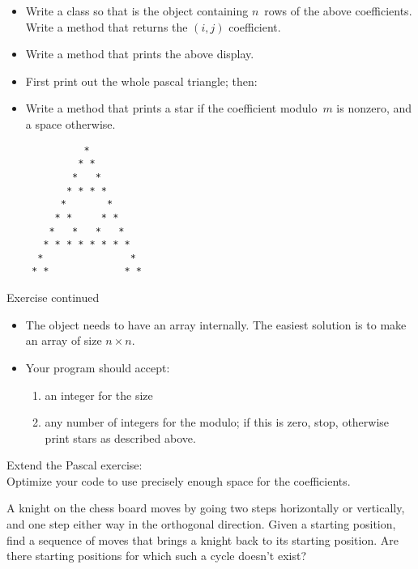 \begin{exercise}
  \label{ex:pascal-ex}
  \small
  \begin{itemize}
  \item 
    Write a class  so that  is the object
    containing $n$~rows of the above coefficients. Write a method
     that returns the $(i,j)$ coefficient.
  \item
    Write a method  that prints the above display.
  \item First print out the whole pascal triangle; then:
  \item
    Write a method  that prints a star if the
    coefficient modulo~$m$ is nonzero, and a space otherwise.
\begin{verbatim}
          *
         * *
        *   *
       * * * *
      *       *
     * *     * *
    *   *   *   *
   * * * * * * * *
  *               *
 * *             * *
\end{verbatim}
  \end{itemize}
\end{exercise}
\begin{block}{Exercise continued}
  \label{sl:pascal-ex-contd}
  \begin{itemize}
  \item
    The object needs to have an array internally. The easiest solution
    is to make an array of size $n\times n$.
  \item Your program should accept:
    \begin{enumerate}
    \item
      an integer for the size
    \item any number of integers for the modulo; if this is zero, stop,
      otherwise print stars as described above.
    \end{enumerate}
  \end{itemize}
\end{block}


\begin{exercise}
  \label{ex:pascal-ey}
  Extend the Pascal exercise:\\
  Optimize your code to use
  precisely enough space for the coefficients.
\end{exercise}

\begin{exercise}
  A knight on the chess board moves by going two steps horizontally or
  vertically, and one step either way in the orthogonal
  direction. Given a starting position, find a sequence of moves that
  brings a knight back to its starting position. Are there starting
  positions for which such a cycle doesn't exist?
\end{exercise}

